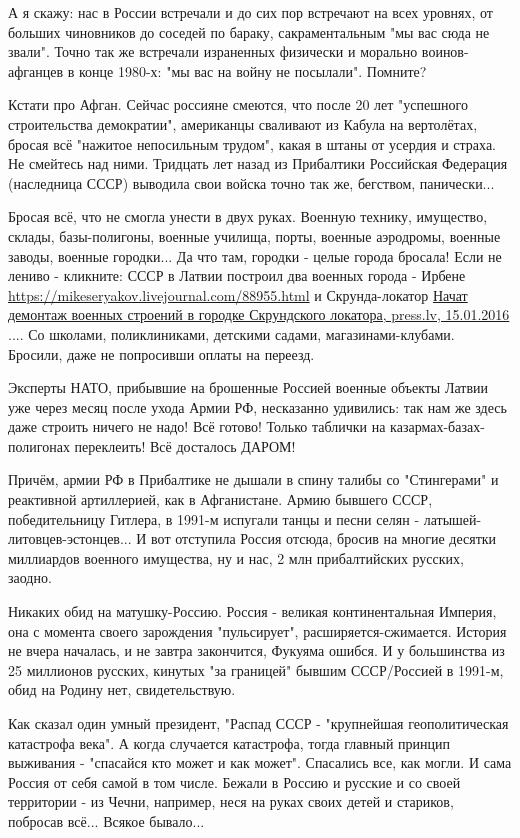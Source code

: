 А я скажу: нас в России встречали и до сих пор встречают на всех уровнях, от
больших чиновников до соседей по бараку, сакраментальным "мы вас сюда не
звали". Точно так же встречали израненных физически и морально воинов-афганцев
в конце 1980-х: "мы вас на войну не посылали". Помните?

Кстати про Афган. Сейчас россияне смеются, что после 20 лет "успешного
строительства демократии", американцы сваливают из Кабула на вертолётах, бросая
всё "нажитое непосильным трудом", какая в штаны от усердия и страха. Не
смейтесь над ними. Тридцать лет назад из Прибалтики Российская Федерация
(наследница СССР) выводила свои войска точно так же, бегством, панически...

Бросая всё, что не смогла унести в двух руках. Военную технику, имущество,
склады, базы-полигоны, военные училища, порты, военные аэродромы, военные
заводы, военные городки... Да что там, городки  -  целые города бросала! Если не
лениво  -  кликните: СССР в Латвии построил два военных города  -  Ирбене
\url{https://mikeseryakov.livejournal.com/88955.html} и Скрунда-локатор
\href{https://press.lv/post/nachat-demontazh-voennyh-stroenij-v-gorodke-skrundskogo-lokatora}{%
Начат демонтаж военных строений в городке Скрундского локатора, press.lv, 15.01.2016%
}
.... Со школами,
поликлиниками, детскими садами, магазинами-клубами. Бросили, даже не попросивши
оплаты на переезд.

Эксперты НАТО, прибывшие на брошенные Россией военные объекты Латвии уже через
месяц после ухода Армии РФ, несказанно удивились: так нам же здесь даже строить
ничего не надо! Всё готово! Только таблички на казармах-базах-полигонах
переклеить! Всё досталось ДАРОМ!

Причём, армии РФ в Прибалтике не дышали в спину талибы со "Стингерами" и
реактивной артиллерией, как в Афганистане. Армию бывшего СССР, победительницу
Гитлера, в 1991-м испугали танцы и песни селян  -  латышей-литовцев-эстонцев...
И вот отступила Россия отсюда, бросив на многие десятки миллиардов военного
имущества, ну и нас, 2 млн прибалтийских русских, заодно.

Никаких обид на матушку-Россию. Россия  -  великая континентальная Империя, она
с момента своего зарождения "пульсирует", расширяется-сжимается. История не
вчера началась, и не завтра закончится, Фукуяма ошибся. И у большинства из 25
миллионов русских, кинутых "за границей" бывшим СССР/Россией в 1991-м, обид на
Родину нет, свидетельствую. 

Как сказал один умный президент, "Распад СССР  -  "крупнейшая геополитическая
катастрофа века". А когда случается катастрофа, тогда главный принцип выживания
 -  "спасайся кто может и как может". Спасались все, как могли. И сама Россия от
себя самой в том числе. Бежали в Россию и русские и со своей территории  -  из
Чечни, например, неся на руках своих детей и стариков, побросав всё... Всякое
бывало...

